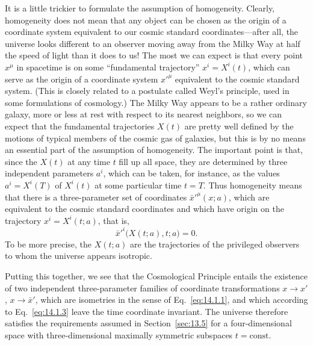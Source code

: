 It is a little trickier to formulate the assumption of homogeneity. Clearly,
homogeneity does not mean that any object can be chosen as the origin of a
coordinate system equivalent to our cosmic standard coordinates---after all,
the universe looks different to an observer moving away from the Milky Way at
half the speed of light than it does to us! The most we can expect is that
every point \(x^\mu\) in spacetime is on some ``fundamental trajectory''
\(x^i=X^i(t)\), which can serve as the origin of a coordinate system
\(x'^\mu\) equivalent to the cosmic standard system. (This is closely related
to a postulate called Weyl's principle, used in some formulations of
cosmology.) The Milky Way appears to be a rather ordinary galaxy, more or less
at rest with respect to its nearest neighbors, so we can expect that the
fundamental trajectories \(X(t)\) are pretty well defined by the motions of
typical members of the cosmic gas of galaxies, but this is by no means an
essential part of the assumption of homogeneity. The important point is that,
since the \(X(t)\) at any time \(t\) fill up all space, they are determined by
three independent parameters \(a^i\), which can be taken, for instance, as the
values \(a^i=X^i(T)\) of \(X^i(t)\) at some particular time \(t=T\). Thus
homogeneity means that there is a three-parameter set of coordinates
\(\bar x'^\mu(x;a)\), which are equivalent to the cosmic standard coordinates
and which have origin on the trajectory \(x^i=X^i(t;a)\), that is,
\begin{equation}
  \bar x'^i\bigl(X(t;a),t;a\bigr)=0.
  \tag{14.1.5}\label{eq:14.1.5}
\end{equation}
To be more precise, the \(X(t;a)\) are the trajectories of the privileged
observers to whom the universe appears isotropic.

Putting this together, we see that the Cosmological Principle entails the
existence of two independent three-parameter families of coordinate
transformations \(x\longrightarrow x'\), \(x\longrightarrow\bar x'\), which
are isometries in the sense of Eq.~\eqref{eq:14.1.1}, and which according to
Eq.~\eqref{eq:14.1.3} leave the time coordinate invariant. The universe
therefore satisfies the requirements assumed in Section~\ref{sec:13.5} for a
four-dimensional space with three-dimensional maximally symmetric subspaces
\(t=\text{const}\).

